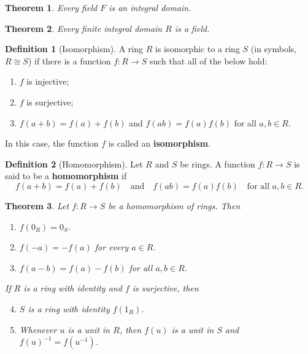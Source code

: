 \documentclass{article}
\newtheorem{theorem}{Theorem}[section]
\theoremstyle{definition}
\newtheorem{definition}{Definition}[section]
\theoremstyle{remark}
\begin{document}
\begin{theorem}\label{thm:fields are integral domains}
Every field $F$ is an integral domain.
\end{theorem}




\begin{theorem}\label{thm:finite integral domain is field}
Every finite integral domain $R$ is a field.
\end{theorem}





\begin{definition}[Isomorphism]
A ring $R$ is isomorphic to a ring $S$ (in symbols, $R \cong S$) if there is a function $f: R \to S$ such that all of the below hold:
\begin{enumerate}
\item $f$ is injective;
\item $f$ is surjective;
\item $f(a + b) = f(a) + f(b)$ \quad and \quad $f(ab) = f(a) f(b)$ for all $a, b \in R$.
\end{enumerate}
In this case, the function $f$ is called an \textbf{isomorphism}.
\end{definition}


\begin{definition}[Homomorphism]
Let $R$ and $S$ be rings. A function $f: R \to S$ is said to be a \textbf{homomorphism} if
\[
f(a + b) = f(a) + f(b) \quad \text{and} \quad f(ab) = f(a) f(b) \quad \text{for all } a, b \in R.
\]
\end{definition}










\begin{theorem}\label{thm:homomorphism property}
Let $f: R \to S$ be a homomorphism of rings. Then
\begin{enumerate}
\item $f(0_R) = 0_S$.
\item $f(-a) = -f(a)$ for every $a \in R$.
\item $f(a - b) = f(a) - f(b)$ for all $a, b \in R$.
\end{enumerate}
If $R$ is a ring with identity and $f$ is surjective, then
\begin{enumerate}
\setcounter{enumi}{3}
\item $S$ is a ring with identity $f(1_R)$.
\item Whenever $u$ is a unit in $R$, then $f(u)$ is a unit in $S$ and $f(u)^{-1} = f(u^{-1})$.
\end{enumerate}
\end{theorem}                
\end{document}

